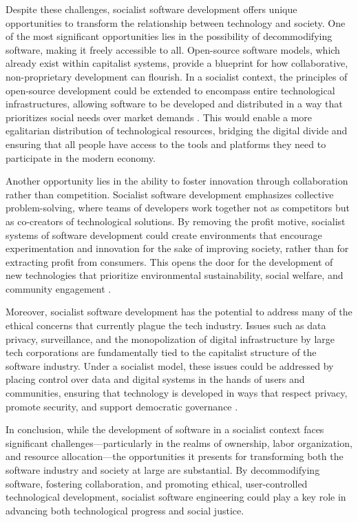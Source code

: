 \begin{refsection}
Despite these challenges, socialist software development offers unique opportunities to transform the relationship between technology and society. One of the most significant opportunities lies in the possibility of decommodifying software, making it freely accessible to all. Open-source software models, which already exist within capitalist systems, provide a blueprint for how collaborative, non-proprietary development can flourish. In a socialist context, the principles of open-source development could be extended to encompass entire technological infrastructures, allowing software to be developed and distributed in a way that prioritizes social needs over market demands \cite[pp.~29-30]{weber}. This would enable a more egalitarian distribution of technological resources, bridging the digital divide and ensuring that all people have access to the tools and platforms they need to participate in the modern economy.

Another opportunity lies in the ability to foster innovation through collaboration rather than competition. Socialist software development emphasizes collective problem-solving, where teams of developers work together not as competitors but as co-creators of technological solutions. By removing the profit motive, socialist systems of software development could create environments that encourage experimentation and innovation for the sake of improving society, rather than for extracting profit from consumers. This opens the door for the development of new technologies that prioritize environmental sustainability, social welfare, and community engagement \cite[pp.~56-57]{dyer-witheford}.

Moreover, socialist software development has the potential to address many of the ethical concerns that currently plague the tech industry. Issues such as data privacy, surveillance, and the monopolization of digital infrastructure by large tech corporations are fundamentally tied to the capitalist structure of the software industry. Under a socialist model, these issues could be addressed by placing control over data and digital systems in the hands of users and communities, ensuring that technology is developed in ways that respect privacy, promote security, and support democratic governance \cite[pp.~212]{morozov}.

In conclusion, while the development of software in a socialist context faces significant challenges—particularly in the realms of ownership, labor organization, and resource allocation—the opportunities it presents for transforming both the software industry and society at large are substantial. By decommodifying software, fostering collaboration, and promoting ethical, user-controlled technological development, socialist software engineering could play a key role in advancing both technological progress and social justice.


\end{refsection}

